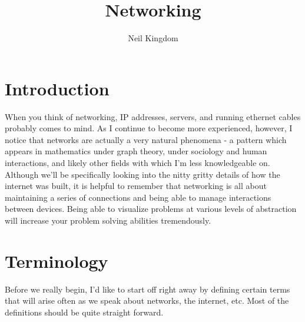 \documentclass{article}
\title{Networking}
\author{Neil Kingdom}
\begin{document}
\begin{titlingpage}

\maketitle

\end{titlingpage}

\newpage

\tableofcontents

\newpage

\section{Introduction}

When you think of networking, IP addresses, servers, and running ethernet cables probably comes to mind. As I
continue to become more experienced, however, I notice that networks are actually a very natural phenomena - a
pattern which appears in mathematics under graph theory, under sociology and human interactions, and likely
other fields with which I'm less knowledgeable on. Although we'll be specifically looking into the nitty gritty
details of how the internet was built, it is helpful to remember that networking is all about maintaining a
series of connections and being able to manage interactions between devices. Being able to visualize problems
at various levels of abstraction will increase your problem solving abilities tremendously.

\section{Terminology}

Before we really begin, I’d like to start off right away by defining certain terms that will arise often as we
speak about networks, the internet, etc. Most of the definitions should be quite straight forward.
\end{document}
